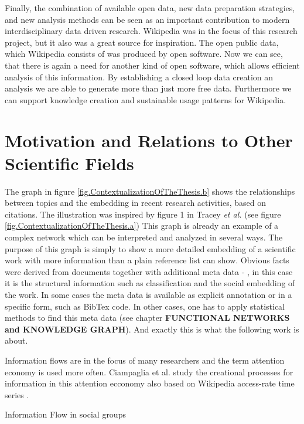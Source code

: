 \documentclass[a4paper,10pt]{scrbook}
\begin{document}
Finally, the combination of available open data, new data preparation strategies, and new analysis methods can be seen as an important contribution to modern interdisciplinary data driven research. Wikipedia was in the focus of this research project, but it also was a great source for inspiration. The open public data, which Wikipedia consists of was produced by open software. Now we can see, that there is again a need for another kind of open software, which allows efficient analysis of this information. By establishing a closed loop data creation an analysis we are able to generate more than just more free data. Furthermore we can support knowledge creation and sustainable usage patterns for Wikipedia.  

 

\section{Motivation and Relations to Other Scientific Fields}
The graph in figure \ref{fig.ContextualizationOfTheThesis.b} shows the relationships between topics and the embedding in recent research activities, based on citations. The illustration was inspired by figure 1 in Tracey \textit{et al.} \cite{Tracey1998} (see figure \ref{fig.ContextualizationOfTheThesis.a}) This graph is already an example of a complex network which can be interpreted and analyzed in several ways. The purpose of this graph is simply to show a more detailed embedding of a scientific work with more information than a plain reference list can show. Obvious facts were derived from documents together with additional meta data - , in this case it is the structural information such as classification and the social embedding of the work. In some cases the meta data is available as explicit annotation or in a specific form, such as BibTex code. In other cases, one has to apply statistical methods to find this meta data (see chapter \textbf{FUNCTIONAL NETWORKS and KNOWLEDGE GRAPH}). And exactly this is what the following work is about.   

Information flows are in the focus of many researchers and the term attention economy is used more often. Ciampaglia et al. study the creational processes for information in this attention ecconomy also based on Wikipedia access-rate time series \cite{Ciampaglia2015}.

Information Flow in social groups 

%
%
\end{document}
